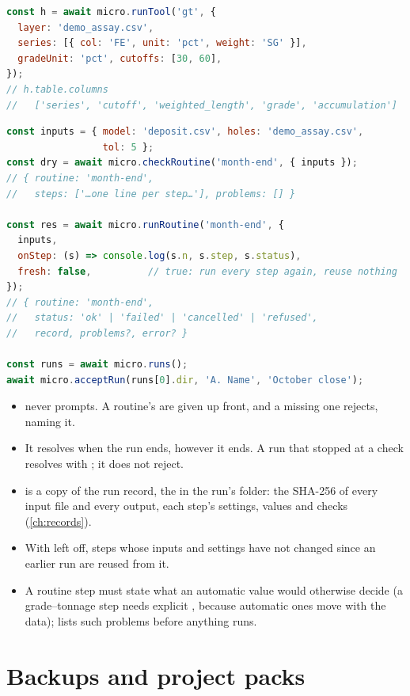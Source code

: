 \begin{lstlisting}[language=js]
const h = await micro.runTool('gt', {
  layer: 'demo_assay.csv',
  series: [{ col: 'FE', unit: 'pct', weight: 'SG' }],
  gradeUnit: 'pct', cutoffs: [30, 60],
});
// h.table.columns
//   ['series', 'cutoff', 'weighted_length', 'grade', 'accumulation']
\end{lstlisting}

\begin{lstlisting}[language=js]
const inputs = { model: 'deposit.csv', holes: 'demo_assay.csv',
                 tol: 5 };
const dry = await micro.checkRoutine('month-end', { inputs });
// { routine: 'month-end',
//   steps: ['…one line per step…'], problems: [] }

const res = await micro.runRoutine('month-end', {
  inputs,
  onStep: (s) => console.log(s.n, s.step, s.status),
  fresh: false,          // true: run every step again, reuse nothing
});
// { routine: 'month-end',
//   status: 'ok' | 'failed' | 'cancelled' | 'refused',
//   record, problems?, error? }

const runs = await micro.runs();
await micro.acceptRun(runs[0].dir, 'A. Name', 'October close');
\end{lstlisting}

\begin{itemize}
\item {} never prompts. A routine's  are given up front, and a missing
  one rejects, naming it.
\item It resolves when the run ends, however it ends. A run that stopped at a check resolves with
  ; it does not reject.
\item {} is a copy of the run record, the  in the run's folder: the
  SHA-256 of every input file and every output, each step's settings, values and checks
  (\cref{ch:records}).
\item With  left off, steps whose inputs and settings have not changed since an earlier
  run are reused from it.
\item A routine step must state what an automatic value would otherwise decide (a grade–tonnage
  step needs explicit , because automatic ones move with the data);
   lists such problems before anything runs.
\end{itemize}

\section{Backups and project packs}\label{sec:host-packs}

